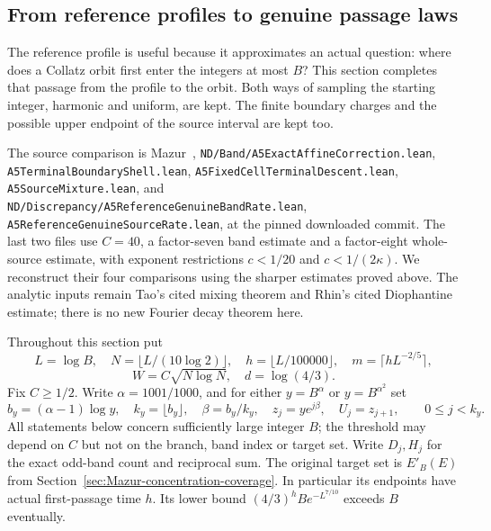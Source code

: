 \subsection{From reference profiles to genuine passage laws}
\label{sec:Mazur-genuine-assembly}

The reference profile is useful because it approximates an actual question:
where does a Collatz orbit first enter the integers at most $B$? This section
completes that passage from the profile to the orbit. Both ways of sampling
the starting integer, harmonic and uniform, are kept. The finite boundary
charges and the possible upper endpoint of the source interval are kept too.

The source comparison is Mazur~\cite{Mazur2026v2},
\texttt{ND/Band/A5ExactAffineCorrection.lean},
\texttt{A5TerminalBoundaryShell.lean},
\texttt{A5FixedCellTerminalDescent.lean},
\texttt{A5SourceMixture.lean}, and
\texttt{ND/Discrepancy/A5ReferenceGenuineBandRate.lean},
\texttt{A5ReferenceGenuineSourceRate.lean}, at the pinned downloaded commit.
The last two files use $C=40$, a factor-seven band estimate and a factor-eight
whole-source estimate, with exponent restrictions $c<1/20$ and
$c<1/(2\kappa)$. We reconstruct their four comparisons using the sharper
estimates proved above. The analytic inputs remain Tao's cited mixing
theorem and Rhin's cited Diophantine estimate; there is no new Fourier
decay theorem here.

Throughout this section put
\[
 L=\log B,\quad N=\lfloor L/(10\log2)\rfloor,\quad
 h=\lfloor L/100000\rfloor,\quad m=\lceil hL^{-2/5}\rceil,
\]
\[
 W=C\sqrt{N\log N},\quad d=\log(4/3).
\]
Fix $C\ge1/2$. Write $\alpha=1001/1000$, and for either
$y=B^\alpha$ or $y=B^{\alpha^2}$ set
\[
 b_y=(\alpha-1)\log y,\quad k_y=\lfloor b_y\rfloor,\quad
 \beta=b_y/k_y,\quad z_j=ye^{j\beta},\quad U_j=z_{j+1},
 \qquad 0\le j<k_y.
\]
All statements below concern sufficiently large integer $B$; the threshold
may depend on $C$ but not on the branch, band index or target set.
Write $D_j,H_j$ for the exact odd-band count and reciprocal sum.
The original target set is $E'_B(E)$ from
Section~\ref{sec:Mazur-concentration-coverage}. In particular its endpoints
have actual first-passage time $h$. Its lower bound
$(4/3)^hBe^{-L^{7/10}}$ exceeds $B$ eventually.

